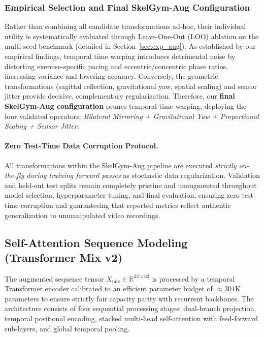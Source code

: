 \documentclass[runningheads]{llncs}
\begin{document}
\subsubsection{Empirical Selection and Final SkelGym-Aug Configuration}
Rather than combining all candidate transformations ad-hoc, their individual utility is systematically evaluated through Leave-One-Out (LOO) ablation on the multi-seed benchmark (detailed in Section~\ref{sec:exp_aug}). As established by our empirical findings, temporal time warping introduces detrimental noise by distorting exercise-specific pacing and eccentric/concentric phase ratios, increasing variance and lowering accuracy. Conversely, the geometric transformations (sagittal reflection, gravitational yaw, spatial scaling) and sensor jitter provide decisive, complementary regularization. Therefore, our \textbf{final SkelGym-Aug configuration} prunes temporal time warping, deploying the four validated operators: \textit{Bilateral Mirroring + Gravitational Yaw + Proportional Scaling + Sensor Jitter}.

\paragraph{Zero Test-Time Data Corruption Protocol.}
All transformations within the SkelGym-Aug pipeline are executed \textit{strictly on-the-fly during training forward passes} as stochastic data regularization. Validation and held-out test splits remain completely pristine and unaugmented throughout model selection, hyperparameter tuning, and final evaluation, ensuring zero test-time corruption and guaranteeing that reported metrics reflect authentic generalization to unmanipulated video recordings.

\subsection{Self-Attention Sequence Modeling (Transformer Mix v2)}
The augmented sequence tensor $X_{\text{mix}} \in \mathbb{R}^{32 \times 63}$ is processed by a temporal Transformer encoder \cite{vaswani2017} calibrated to an efficient parameter budget of $\approx 301\text{K}$ parameters to ensure strictly fair capacity parity with recurrent backbones. The architecture consists of four sequential processing stages: dual-branch projection, temporal positional encoding, stacked multi-head self-attention with feed-forward sub-layers, and global temporal pooling.
\end{document}
